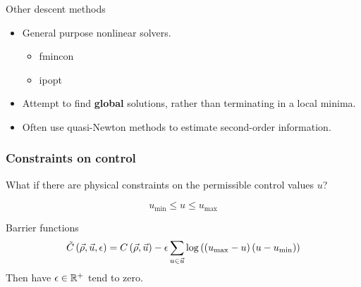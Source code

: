 \begin{frame}{Other descent methods}

\begin{itemize}
	\item General purpose nonlinear solvers.
	\begin{itemize}
		\item fmincon
		\item ipopt
	\end{itemize}
	\item Attempt to find \textbf{global} solutions, rather than terminating in a local minima.
	\item Often use quasi-Newton methods to estimate second-order information.
\end{itemize}

\end{frame}


\begin{frame}[t]\frametitle{Constraints on control}

What if there are physical constraints on the permissible control values $u$?

\begin{equation}
    u_{\min} \le u \le u_{\max}
\end{equation}
    
\begin{block}{Barrier functions}
\begin{equation}
\tilde{C}\left(\vec{\rho},\vec{u},\epsilon\right)=C\left(\vec{\rho},\vec{u}\right)-\epsilon\sum_{u\in\vec{u}}\log\left(\left(u_{\max}-u\right)\left(u-u_{\min}\right)\right)\label{eq:full-tilde}
\end{equation}
Then have $\epsilon\in\mathbb{R}^{+}$ tend to zero.
\end{block}


\end{frame}


